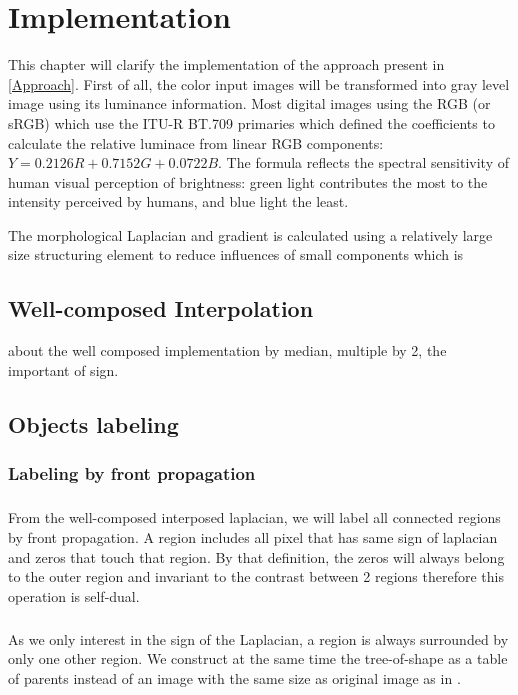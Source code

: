 
\graphicspath{ {5chapterImplementation/image/} }
\chapter{Implementation}

This chapter will clarify the implementation of the approach present in \autoref{Approach}. 
First of all, the color input images will be transformed into gray level image using its luminance information. Most digital images using the RGB (or sRGB) which use the ITU-R BT.709 primaries which defined the coefficients to calculate the relative luminace from linear RGB components: $Y = 0.2126R + 0.7152G + 0.0722B$. The formula reflects the spectral sensitivity of human visual perception of brightness: green light contributes the most to the intensity perceived by humans, and blue light the least.
\par The morphological Laplacian and gradient is calculated using a relatively large size structuring element to reduce influences of small components which is 

\section{Well-composed Interpolation}

about the well composed implementation by median, multiple by 2, the important of sign.


\section{Objects labeling}

\subsection{Labeling by front propagation}
\paragraph{} From the well-composed interposed laplacian, we will label all connected regions by front propagation. A region includes all pixel that has same sign of laplacian and zeros that touch that region. By that definition, the zeros will always belong to the outer region and invariant to the contrast between 2 regions therefore this operation is self-dual. 
\paragraph{}As we only interest in the sign of the Laplacian, a region is always surrounded by only one other region. We construct at the same time the tree-of-shape as a table of parents instead of an image with the same size as original image as in \cite{geraud.13.ismm}. 


